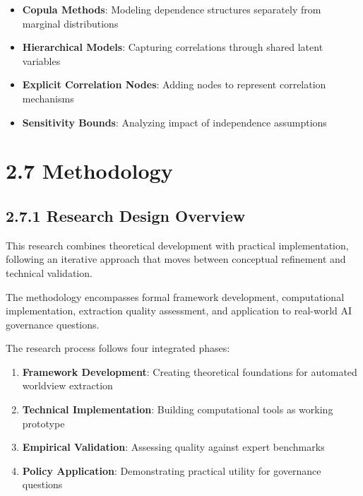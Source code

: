 \documentclass[
  11pt,
  letterpaper,
]{book}
\providecommand{\tightlist}{%
  \setlength{\itemsep}{0pt}\setlength{\parskip}{0pt}}
\begin{document}
\begin{itemize}
\tightlist
\item
  \textbf{Copula Methods}: Modeling dependence structures separately
  from marginal distributions
\item
  \textbf{Hierarchical Models}: Capturing correlations through shared
  latent variables
\item
  \textbf{Explicit Correlation Nodes}: Adding nodes to represent
  correlation mechanisms
\item
  \textbf{Sensitivity Bounds}: Analyzing impact of independence
  assumptions
\end{itemize}

\textcite{nelson2006}

\section*{2.7 Methodology}\label{sec-methodology}


\subsection*{2.7.1 Research Design Overview}\label{sec-research-design}

This research combines theoretical development with practical
implementation, following an iterative approach that moves between
conceptual refinement and technical validation.

The methodology encompasses formal framework development, computational
implementation, extraction quality assessment, and application to
real-world AI governance questions.

The research process follows four integrated phases:

\begin{enumerate}
\def\labelenumi{\arabic{enumi}.}
\tightlist
\item
  \textbf{Framework Development}: Creating theoretical foundations for
  automated worldview extraction
\item
  \textbf{Technical Implementation}: Building computational tools as
  working prototype
\item
  \textbf{Empirical Validation}: Assessing quality against expert
  benchmarks
\item
  \textbf{Policy Application}: Demonstrating practical utility for
  governance questions
\end{enumerate}
\end{document}
